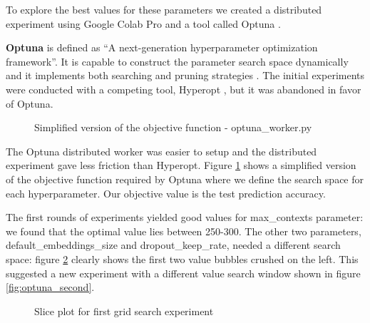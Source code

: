 To explore the best values for these parameters we created a distributed experiment using Google Colab Pro and a tool called Optuna . 

\textbf{Optuna} is defined as ``A next-generation hyperparameter optimization framework''. It is capable to construct the parameter search space dynamically and it implements both searching and pruning strategies \cite{optuna_2019}. The initial experiments were conducted with a competing tool, Hyperopt \cite{bergstra2013making}, but it was abandoned in favor of Optuna.

\begin{figure}
 \centering
 \caption[]{Simplified version of the objective function - optuna\_worker.py}
    \label{fig:optuna_objective}
\end{figure}

The Optuna distributed worker was easier to setup and the distributed experiment gave less friction than Hyperopt. Figure \ref{fig:optuna_objective} shows a simplified version of the objective function required by Optuna where we define the search space for each hyperparameter. Our objective value is the test prediction accuracy.

The first rounds of experiments yielded good values for max\_contexts parameter: we found that the optimal value lies between 250-300. The other two parameters, default\_embeddings\_size and dropout\_keep\_rate, needed a different search space: figure \ref{fig:optuna_first} clearly shows the first two value bubbles crushed on the left. This suggested a new experiment with a different value search window shown in figure \ref{fig:optuna_second}. 

\begin{figure}
 \centering
 \caption[]{Slice plot for first grid search experiment}
    \label{fig:optuna_first}
\end{figure}


